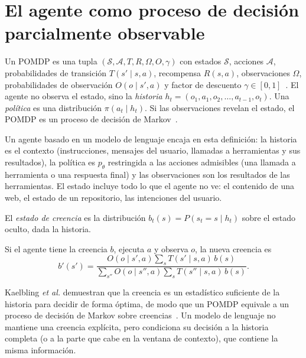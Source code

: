 \addtocounter{definicion}{1}%

\section{El agente como proceso de decisión parcialmente observable}

\begin{definicion}\label{def:pomdp}
Un POMDP es una tupla $(\mathcal{S},\mathcal{A},T,R,\Omega,O,\gamma)$ con estados $\mathcal{S}$, acciones $\mathcal{A}$, probabilidades de transición $T(s'\mid s,a)$, recompensa $R(s,a)$, observaciones $\Omega$, probabilidades de observación $O(o\mid s',a)$ y factor de descuento $\gamma\in[0,1]$~\cite{kaelbling}. El agente no observa el estado, sino la \emph{historia} $h_t=(o_1,a_1,o_2,\dots,a_{t-1},o_t)$. Una \emph{política} es una distribución $\pi(a_t\mid h_t)$. Si las observaciones revelan el estado, el POMDP es un proceso de decisión de Markov~\cite[cap.~3]{sb}.
\end{definicion}

Un agente basado en un modelo de lenguaje encaja en esta definición: la historia es el contexto (instrucciones, mensajes del usuario, llamadas a herramientas y sus resultados), la política es $p_\theta$ restringida a las acciones admisibles (una llamada a herramienta o una respuesta final) y las observaciones son los resultados de las herramientas. El estado incluye todo lo que el agente no ve: el contenido de una web, el estado de un repositorio, las intenciones del usuario.

\begin{definicion}\label{def:creencia}
El \emph{estado de creencia} es la distribución $b_t(s)=P(s_t=s\mid h_t)$ sobre el estado oculto, dada la historia.
\end{definicion}

\begin{proposicion}\label{prop:creencia}
Si el agente tiene la creencia $b$, ejecuta $a$ y observa $o$, la nueva creencia es
\[
b'(s')=\frac{O(o\mid s',a)\sum_{s}T(s'\mid s,a)\,b(s)}{\sum_{s''}O(o\mid s'',a)\sum_{s}T(s''\mid s,a)\,b(s)} .
\]
\end{proposicion}

Kaelbling \emph{et al.} demuestran que la creencia es un estadístico suficiente de la historia para decidir de forma óptima, de modo que un POMDP equivale a un proceso de decisión de Markov sobre creencias~\cite{kaelbling}. Un modelo de lenguaje no mantiene una creencia explícita, pero condiciona su decisión a la historia completa (o a la parte que cabe en la ventana de contexto), que contiene la misma información.

